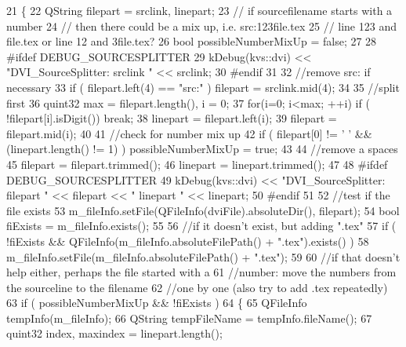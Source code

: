 \begin{DoxyCode}
21 \{
22   QString filepart = srclink, linepart;
23   \textcolor{comment}{// if sourcefilename starts with a number}
24   \textcolor{comment}{// then there could be a mix up, i.e. src:123file.tex}
25   \textcolor{comment}{// line 123 and file.tex or line 12 and 3file.tex?}
26   \textcolor{keywordtype}{bool} possibleNumberMixUp = \textcolor{keyword}{false};
27 
28 \textcolor{preprocessor}{#ifdef DEBUG\_SOURCESPLITTER}
29   kDebug(kvs::dvi) << \textcolor{stringliteral}{"DVI\_SourceSplitter: srclink "} << srclink;
30 \textcolor{preprocessor}{#endif}
31 
32   \textcolor{comment}{//remove src: if necessary}
33   \textcolor{keywordflow}{if} ( filepart.left(4) == \textcolor{stringliteral}{"src:"} ) filepart = srclink.mid(4);
34 
35   \textcolor{comment}{//split first}
36   quint32 max = filepart.length(), i = 0;
37   \textcolor{keywordflow}{for}(i=0; i<max; ++i) \textcolor{keywordflow}{if} ( !filepart[i].isDigit()) \textcolor{keywordflow}{break};
38   linepart = filepart.left(i);
39   filepart = filepart.mid(i);
40 
41   \textcolor{comment}{//check for number mix up}
42   \textcolor{keywordflow}{if} ( filepart[0] != \textcolor{charliteral}{' '} && (linepart.length() != 1) ) possibleNumberMixUp = \textcolor{keyword}{true};
43 
44   \textcolor{comment}{//remove a spaces}
45   filepart = filepart.trimmed();
46   linepart = linepart.trimmed();
47 
48 \textcolor{preprocessor}{#ifdef DEBUG\_SOURCESPLITTER}
49   kDebug(kvs::dvi) << \textcolor{stringliteral}{"DVI\_SourceSplitter: filepart "} << filepart << \textcolor{stringliteral}{" linepart "} << linepart;
50 \textcolor{preprocessor}{#endif}
51 
52   \textcolor{comment}{//test if the file exists}
53   m\_fileInfo.setFile(QFileInfo(dviFile).absoluteDir(), filepart);
54   \textcolor{keywordtype}{bool} fiExists = m\_fileInfo.exists();
55 
56   \textcolor{comment}{//if it doesn't exist, but adding ".tex"}
57   \textcolor{keywordflow}{if} ( !fiExists && QFileInfo(m\_fileInfo.absoluteFilePath() + \textcolor{stringliteral}{".tex"}).exists() )
58     m\_fileInfo.setFile(m\_fileInfo.absoluteFilePath() + \textcolor{stringliteral}{".tex"});
59 
60   \textcolor{comment}{//if that doesn't help either, perhaps the file started with a}
61   \textcolor{comment}{//number: move the numbers from the sourceline to the filename}
62   \textcolor{comment}{//one by one (also try to add .tex repeatedly)}
63   \textcolor{keywordflow}{if} ( possibleNumberMixUp && !fiExists )
64   \{
65     QFileInfo tempInfo(m\_fileInfo);
66     QString tempFileName = tempInfo.fileName();
67     quint32 index, maxindex = linepart.length();

\end{DoxyCode}
